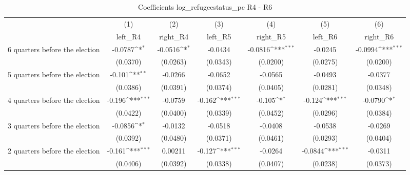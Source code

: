 \begin{table}[htbp]\centering
\def\sym#1{\ifmmode^{#1}\else\(^{#1}\)\fi}
\caption{Coefficients log\_refugeestatus\_pc R4 - R6}
\begin{tabular}{l*{6}{c}}
\hline\hline
                    &\multicolumn{1}{c}{(1)}&\multicolumn{1}{c}{(2)}&\multicolumn{1}{c}{(3)}&\multicolumn{1}{c}{(4)}&\multicolumn{1}{c}{(5)}&\multicolumn{1}{c}{(6)}\\
                    &\multicolumn{1}{c}{left\_R4}&\multicolumn{1}{c}{right\_R4}&\multicolumn{1}{c}{left\_R5}&\multicolumn{1}{c}{right\_R5}&\multicolumn{1}{c}{left\_R6}&\multicolumn{1}{c}{right\_R6}\\
\hline
 6 quarters before the election&     -0.0787\sym{*}  &     -0.0516\sym{*}  &     -0.0434         &     -0.0816\sym{***}&     -0.0245         &     -0.0994\sym{***}\\
                    &    (0.0370)         &    (0.0263)         &    (0.0343)         &    (0.0200)         &    (0.0275)         &    (0.0200)         \\
[1em]
 5 quarters before the election&      -0.101\sym{**} &     -0.0266         &     -0.0652         &     -0.0565         &     -0.0493         &     -0.0377         \\
                    &    (0.0386)         &    (0.0391)         &    (0.0374)         &    (0.0405)         &    (0.0281)         &    (0.0348)         \\
[1em]
 4 quarters before the election&      -0.196\sym{***}&     -0.0759         &      -0.162\sym{***}&      -0.105\sym{*}  &      -0.124\sym{***}&     -0.0790\sym{*}  \\
                    &    (0.0422)         &    (0.0400)         &    (0.0339)         &    (0.0452)         &    (0.0296)         &    (0.0384)         \\
[1em]
 3 quarters before the election&     -0.0856\sym{*}  &     -0.0132         &     -0.0518         &     -0.0408         &     -0.0538         &     -0.0269         \\
                    &    (0.0392)         &    (0.0480)         &    (0.0371)         &    (0.0461)         &    (0.0293)         &    (0.0404)         \\
[1em]
 2 quarters before the election&      -0.161\sym{***}&     0.00211         &      -0.127\sym{***}&     -0.0264         &     -0.0844\sym{***}&     -0.0311         \\
                    &    (0.0406)         &    (0.0392)         &    (0.0338)         &    (0.0407)         &    (0.0238)         &    (0.0373)         \\

\end{tabular}
\end{table}
